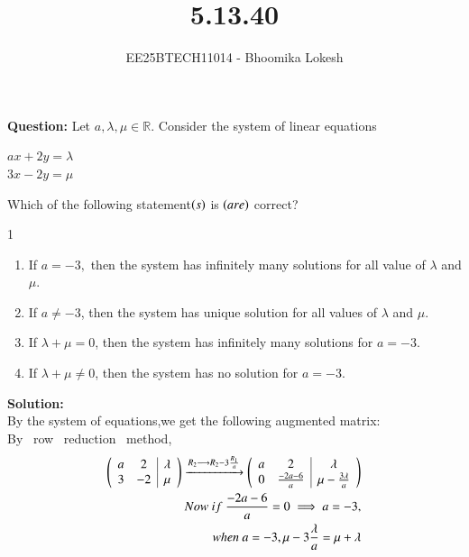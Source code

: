 \documentclass[journal,onecolumn]{IEEEtran}
\begin{document}

\vspace{3cm}

\title{5.13.40}
\author{EE25BTECH11014 - Bhoomika Lokesh}
{\let\newpage\relax\maketitle}

\renewcommand{\thefigure}{\theenumi}
\renewcommand{\thetable}{\theenumi}
\setlength{\intextsep}{10pt} %

\renewcommand{\thetable}{\theenumi}


\textbf{Question:} Let $a,\lambda,\mu \in \mathbb{R}$. Consider the system of linear equations\\
\begin{center}
$ax+2y=\lambda$\\
$3x-2y=\mu$
\end{center}
Which of the following statement$\left(s\right)$ is $\left(are\right)$ correct?
\begin{multicols}{1}
\begin{enumerate}
\item If $a=-3,$ then the system has infinitely many solutions for all value of $\lambda$ and $\mu$.
 \item If $a \neq -3$, then the system has unique solution for all values of $\lambda$ and $\mu.$
 \item  If $\lambda + \mu = 0$, then the system has infinitely many solutions for $a = -3$.
\item  If $\lambda + \mu \neq 0$, then the system has no solution for $a = -3$.
\end{enumerate}
\end{multicols}

\textbf{Solution:}\\
By the system of equations,we get the following augmented matrix:\\
By \ row \ reduction \ method,
\begin{align} 
\begin{pmatrix}\begin{array}{cc|c}
a & 2 & \lambda \\
3 & -2 & \mu
\end{array}\end{pmatrix} \xrightarrow{R_2\longrightarrow R_2-3\frac{R_1}{a}}\begin{pmatrix}\begin{array}{cc|c}
a & 2 & \lambda \\
0 & \frac{-2a-6}{a} & \mu-\frac{3\lambda}{a}
\end{array}\end{pmatrix} \\
Now \ if \ \frac{-2a-6}{a}=0 \implies a=-3,\\
when \ a=-3,\mu-3\frac{\lambda}{a}=\mu+\lambda
\end{align}
\end{document}
